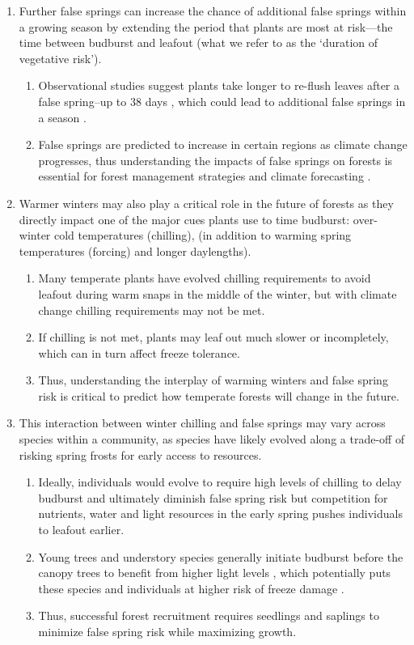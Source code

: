 \documentclass{article}\usepackage[]{graphicx}\usepackage[]{color}
\begin{document}
\begin{enumerate}
\item Further false springs can increase the chance of additional false springs within a growing season by extending the period that plants are most at risk---the time between budburst and leafout (what we refer to as the `duration of vegetative risk'). 
  \begin{enumerate}
  \item Observational studies suggest plants take longer to re-flush leaves after a false spring--up to 38 days \citep{Augspurger2009, Augspurger2013, Gu2008, Menzel2015}, which could lead to additional false springs in a season \citep{Augspurger2009}.
  \item False springs are predicted to increase in certain regions as climate change progresses, thus understanding the impacts of false springs on forests is essential for forest management strategies and climate forecasting \citep{OBrien2019}.
  \end{enumerate}
  
\item Warmer winters may also play a critical role in the future of forests as they directly impact one of the  major cues plants use to time budburst: over-winter cold temperatures (chilling), (in addition to warming spring temperatures (forcing) and longer daylengths).
  \begin{enumerate}
  \item Many temperate plants have evolved chilling requirements to avoid leafout during warm snaps in the middle of the winter, but with climate change chilling requirements may not be met. 
  \item  If chilling is not met, plants may leaf out much slower or incompletely, which can in turn affect freeze tolerance. 
  \item Thus, understanding the interplay of warming winters and false spring risk is critical to predict how temperate forests will change in the future.
  \end{enumerate} 
  
  
\item This interaction between winter chilling and false springs may vary across species within a community, as species have likely evolved along a trade-off of risking spring frosts for early access to resources.
  \begin{enumerate}
  \item Ideally, individuals would evolve to require high levels of chilling to delay budburst and ultimately diminish false spring risk but competition for nutrients, water and light resources in the early spring pushes individuals to leafout earlier. 
  \item Young trees and understory species generally initiate budburst before the canopy trees to benefit from higher light levels \citep {Augspurger2008, Vitasse2013}, which potentially puts these species and individuals at higher risk of freeze damage \citep{Vitasse2014}.
  \item Thus, successful forest recruitment requires seedlings and saplings to minimize false spring risk while maximizing growth.
   \end{enumerate}
 


\end{enumerate}
\end{document}
